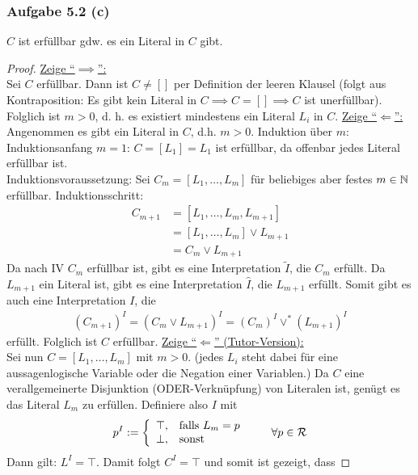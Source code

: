 \subsubsection{Aufgabe 5.2 (c)}
$C$ ist erfüllbar gdw. es ein Literal in $C$ gibt.

\begin{proof}
	\underline{Zeige ``$\implies$'':}\\
	Sei $C$ erfüllbar. 
	Dann ist $C\neq[]$ per Definition der leeren Klausel 
	(folgt aus Kontraposition: Es gibt kein Literal in $C\implies C=[]\implies C$ ist unerfüllbar). 	
	Folglich ist $m>0$, d. h. es existiert mindestens ein Literal $L_i$ in $C$.\nl
	\underline{Zeige ``$\Longleftarrow$'':}\\
	Angenommen es gibt ein Literal in $C$, d.h. $m>0$.
	Induktion über $m$:\\
	Induktionsanfang $m=1$: $C=[L_1]=L_1$ ist erfüllbar, da offenbar jedes Literal erfüllbar ist.\\
	Induktionsvoraussetzung: Sei $C_m=[L_1,\ldots,L_m]$ für beliebiges aber festes $m\in\mathbb{N}$ erfüllbar.
	Induktionsschritt: 
	\begin{align*}
		C_{m+1}
		&=[L_1,\ldots,L_m,L_{m+1}]\\
		&=[L_1,\ldots,L_m]\vee L_{m+1}\\
		&= C_{m}\vee L_{m+1}
	\end{align*}
	Da nach IV $C_m$ erfüllbar ist, gibt es eine Interpretation $\tilde{I}$, die $C_m$ erfüllt. 
	Da $L_{m+1}$ ein Literal ist, gibt es eine Interpretation $\hat{I}$, die $L_{m+1}$ erfüllt. 
	Somit gibt es auch eine Interpretation $I$, die 
	\begin{align*}
		(C_{m+1})^I=(C_{m}\vee L_{m+1})^I=(C_{m})^I\vee^\ast (L_{m+1})^I
	\end{align*}
	erfüllt. Folglich ist $C$ erfüllbar.\nl
	\underline{Zeige ``$\Longleftarrow$'' (Tutor-Version):}\\
	Sei nun $C=[L_1,\ldots,L_m]$ mit $m>0$. 
	(jedes $L_i$ steht dabei für eine aussagenlogische Variable oder die Negation einer Variablen.)
	Da $C$ eine verallgemeinerte Disjunktion (ODER-Verknüpfung) von Literalen ist, genügt es das Literal $L_m$ zu erfüllen. 
	Definiere also $I$ mit
	\begin{align*}
		p^I:=\left\lbrace\begin{array}{cl}
			\top,&\text{falls } L_m=p\\		
			\bot,&\text{sonst }
		\end{array}\right.\qquad\forall p\in\mathcal{R}
	\end{align*}
	Dann gilt: $L^I=\top$. Damit folgt $C^I=\top$ und somit ist gezeigt, dass
\end{proof}

